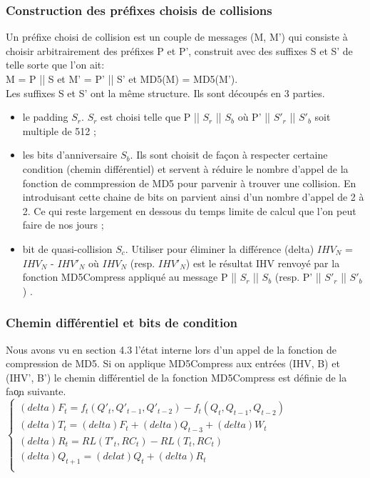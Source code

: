 \documentclass[a4paper,11pt,french]{article}
\begin{document}
\subsubsection{Construction des préfixes choisis de collisions}
Un préfixe choisi de collision est un couple de messages (M, M') qui consiste à choisir arbitrairement des préfixes P et P', construit avec des suffixes S et S' de telle sorte que l'on ait:\\
M = P || S et M' = P' || S' et MD5(M) = MD5(M').\\

Les suffixes S et S' ont la même structure. Ils sont découpés en 3 parties.
\begin{itemize}
\item le padding $S_{r}$. $S_{r}$ est choisi telle que P || $S_{r}$ || $S_{b}$ où P' || $S'_{r}$ || $S'_{b}$ soit multiple de 512 ;
\item les bits d'anniversaire $S_{b}$. Ils sont choisit de façon à respecter certaine condition (chemin différentiel) et servent à réduire le nombre d'appel de la fonction de commpression de MD5 pour parvenir à trouver une collision. En introduisant cette chaine de bits on parvient ainsi d'un nombre d'appel de 2 à 2. Ce qui reste largement en dessous du temps limite de calcul que l'on peut faire de nos jours ;
\item bit de quasi-collision $S_{c}$. Utiliser pour éliminer la différence (delta) $IHV_N$ = $IHV_N$ - $IHV'_N$ où $IHV_N$ (resp. $IHV'_N$) est le résultat IHV renvoyé par la fonction MD5Compress appliqué au message P || $S_{r}$ || $S_{b}$ (resp. P' || $S'_{r}$ || $S'_{b}$) .
\end{itemize}
\vspace{.5cm}


\subsubsection{Chemin différentiel et bits de condition}
Nous avons vu en section 4.3 l'état interne lors d'un appel de la fonction de compression de MD5. Si on applique MD5Compress aux entrées (IHV, B) et (IHV', B') le chemin différentiel de la fonction MD5Compress est définie de la fa\c on suivante.\\

$\left\{
\begin{array}{l}
  (delta)F_t = f_t(Q'_t, Q'_{t-1}, Q'_{t-2}) - f_t(Q_t, Q_{t-1}, Q_{t-2}) \\
  (delta)T_t = (delta)F_t + (delta)Q_{t-3} + (delta)W_t \\
  (delta)R_t = RL(T'_t, RC_t) - RL(T_t, RC_t) \\
  (delta)Q_{t+1} = (delat)Q_t + (delta)R_t \\
\end{array}
\right.$
\vspace{.5cm}
\end{document}
